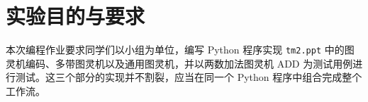 \documentclass{sysucseexp}
\begin{document}

\makecover
\tableofcontents
\cleardoublepage
\pagestyle{main} %

\section{实验目的与要求}

本次编程作业要求同学们以小组为单位，编写 Python 程序实现 \texttt{tm2.ppt} 中的图灵机编码、多带图灵机以及通用图灵机，并以两数加法图灵机 ADD 为测试用例进行测试。这三个部分的实现并不割裂，应当在同一个 Python 程序中组合完成整个工作流。
\end{document}

